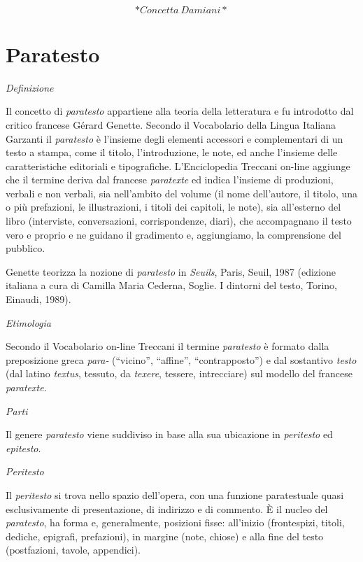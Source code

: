 \documentclass[
  b5paper,
  twoside,
  12pt,
  chapterprefix=false,
  bibliography=totocnumbered,
  parskip=false]{scrbook}
\begin{document}
~

\[*Concetta~Damiani*\]

\hypertarget{paratesto}{%
\chapter{Paratesto}\label{paratesto}}

\emph{Definizione}

Il concetto di \emph{paratesto} appartiene alla teoria della letteratura e fu
introdotto dal critico francese Gérard Genette. Secondo il Vocabolario
della Lingua Italiana Garzanti il \emph{paratesto} è l'insieme degli elementi
accessori e complementari di un testo a stampa, come il titolo,
l'introduzione, le note, ed anche l'insieme delle caratteristiche
editoriali e tipografiche. L'Enciclopedia Treccani on-line aggiunge che
il termine deriva dal francese \emph{paratexte} ed indica l'insieme di
produzioni, verbali e non verbali, sia nell'ambito del volume (il nome
dell'autore, il titolo, una o più prefazioni, le illustrazioni, i titoli
dei capitoli, le note), sia all'esterno del libro (interviste,
conversazioni, corrispondenze, diari), che accompagnano il testo vero e
proprio e ne guidano il gradimento e, aggiungiamo, la comprensione del
pubblico.

Genette teorizza la nozione di \emph{paratesto} in \emph{Seuils}, Paris, Seuil,
1987 (edizione italiana a cura di Camilla Maria Cederna, Soglie. I
dintorni del testo, Torino, Einaudi, 1989).

\emph{Etimologia}

Secondo il Vocabolario on-line Treccani il termine \emph{paratesto} è formato
dalla preposizione greca \emph{para-} (\enquote{vicino}, \enquote{affine}, \enquote{contrapposto}) e
dal sostantivo \emph{testo} (dal latino \emph{textus}, tessuto, da \emph{texere},
tessere, intrecciare) sul modello del francese \emph{paratexte}.

\emph{Parti}

Il genere \emph{paratesto} viene suddiviso in base alla sua ubicazione in
\emph{peritesto} ed \emph{epitesto}.

\emph{Peritesto}

Il \emph{peritesto} si trova nello spazio dell'opera, con una funzione
paratestuale quasi esclusivamente di presentazione, di indirizzo e di
commento. È il nucleo del \emph{paratesto}, ha forma e, generalmente,
posizioni fisse: all'inizio (frontespizi, titoli, dediche, epigrafi,
prefazioni), in margine (note, chiose) e alla fine del testo
(postfazioni, tavole, appendici).
\end{document}
